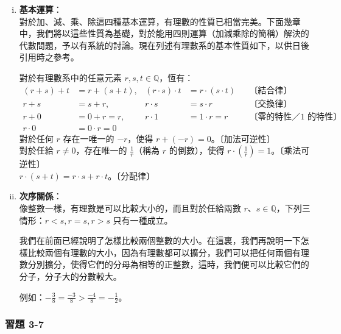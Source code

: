 \begin{enumerate}[(i)]
  \item \textbf{基本運算}：\\
  對於加、減、乘、除這四種基本運算，有理數的性質已相當完美。下面幾章中，我們將以這些性質為基礎，對於能用四則運算（加減乘除的簡稱）解決的代數問題，予以有系統的討論。現在列述有理數系的基本性質如下，以供日後引用時之參考。

  對於有理數系中的任意元素 $r, s, t \in \mathbb{Q}$，恆有：
  \begin{align*}
    (r+s)+t &= r+(s+t), & (r \cdot s) \cdot t &= r \cdot (s \cdot t) && \text{〔結合律〕} \\
    r+s &= s+r, & r \cdot s &= s \cdot r && \text{〔交換律〕} \\
    r+0 &= 0+r = r, & r \cdot 1 &= 1 \cdot r = r && \text{〔零的特性／$1$ 的特性〕} \\
    r \cdot 0 &= 0 \cdot r = 0
  \end{align*}
  對於任何 $r$ 存在一唯一的 $-r$，使得 $r+(-r) = 0$。〔加法可逆性〕\\
  對於任給 $r \neq 0$，存在唯一的 $\frac{1}{r}$（稱為 $r$ 的倒數），使得 $r \cdot \left(\frac{1}{r}\right) = 1$。〔乘法可逆性〕\\
  $r \cdot (s+t) = r \cdot s + r \cdot t$。〔分配律〕

  \item \textbf{次序關係}：\\
  像整數一樣，有理數是可以比較大小的，而且對於任給兩數 $r$、$s \in \mathbb{Q}$，下列三情形：$r < s, r = s, r > s$ 只有一種成立。

  我們在前面已經說明了怎樣比較兩個整數的大小。在這裏，我們再說明一下怎樣比較兩個有理數的大小，因為有理數都可以擴分，我們可以把任何兩個有理數分別擴分，使得它們的分母為相等的正整數，這時，我們便可以比較它們的分子，分子大的分數較大。

  例如：$-\frac{3}{8} = \frac{-3}{8} > \frac{-4}{8} = -\frac{1}{2}$。
\end{enumerate}

\subsubsection*{習題 3-7}\label{sec:ex3-7}

